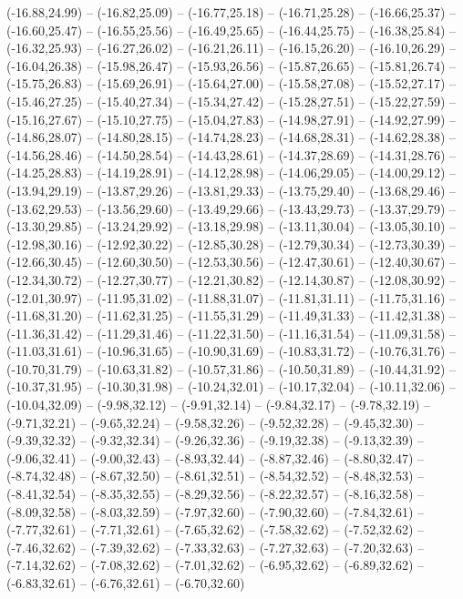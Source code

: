 {  (-16.88,24.99) -- (-16.82,25.09) -- (-16.77,25.18) -- (-16.71,25.28) -- (-16.66,25.37) -- (-16.60,25.47) -- (-16.55,25.56) --
  (-16.49,25.65) -- (-16.44,25.75) -- (-16.38,25.84) -- (-16.32,25.93) -- (-16.27,26.02) -- (-16.21,26.11) -- (-16.15,26.20) --
  (-16.10,26.29) -- (-16.04,26.38) -- (-15.98,26.47) -- (-15.93,26.56) -- (-15.87,26.65) -- (-15.81,26.74) -- (-15.75,26.83) --
  (-15.69,26.91) -- (-15.64,27.00) -- (-15.58,27.08) -- (-15.52,27.17) -- (-15.46,27.25) -- (-15.40,27.34) -- (-15.34,27.42) --
  (-15.28,27.51) -- (-15.22,27.59) -- (-15.16,27.67) -- (-15.10,27.75) -- (-15.04,27.83) -- (-14.98,27.91) -- (-14.92,27.99) --
  (-14.86,28.07) -- (-14.80,28.15) -- (-14.74,28.23) -- (-14.68,28.31) -- (-14.62,28.38) -- (-14.56,28.46) -- (-14.50,28.54) --
  (-14.43,28.61) -- (-14.37,28.69) -- (-14.31,28.76) -- (-14.25,28.83) -- (-14.19,28.91) -- (-14.12,28.98) -- (-14.06,29.05) --
  (-14.00,29.12) -- (-13.94,29.19) -- (-13.87,29.26) -- (-13.81,29.33) -- (-13.75,29.40) -- (-13.68,29.46) -- (-13.62,29.53) --
  (-13.56,29.60) -- (-13.49,29.66) -- (-13.43,29.73) -- (-13.37,29.79) -- (-13.30,29.85) -- (-13.24,29.92) -- (-13.18,29.98) --
  (-13.11,30.04) -- (-13.05,30.10) -- (-12.98,30.16) -- (-12.92,30.22) -- (-12.85,30.28) -- (-12.79,30.34) -- (-12.73,30.39) --
  (-12.66,30.45) -- (-12.60,30.50) -- (-12.53,30.56) -- (-12.47,30.61) -- (-12.40,30.67) -- (-12.34,30.72) -- (-12.27,30.77) --
  (-12.21,30.82) -- (-12.14,30.87) -- (-12.08,30.92) -- (-12.01,30.97) -- (-11.95,31.02) -- (-11.88,31.07) -- (-11.81,31.11) --
  (-11.75,31.16) -- (-11.68,31.20) -- (-11.62,31.25) -- (-11.55,31.29) -- (-11.49,31.33) -- (-11.42,31.38) -- (-11.36,31.42) --
  (-11.29,31.46) -- (-11.22,31.50) -- (-11.16,31.54) -- (-11.09,31.58) -- (-11.03,31.61) -- (-10.96,31.65) -- (-10.90,31.69) --
  (-10.83,31.72) -- (-10.76,31.76) -- (-10.70,31.79) -- (-10.63,31.82) -- (-10.57,31.86) -- (-10.50,31.89) -- (-10.44,31.92) --
  (-10.37,31.95) -- (-10.30,31.98) -- (-10.24,32.01) -- (-10.17,32.04) -- (-10.11,32.06) -- (-10.04,32.09) -- (-9.98,32.12) --
  (-9.91,32.14) -- (-9.84,32.17) -- (-9.78,32.19) -- (-9.71,32.21) -- (-9.65,32.24) -- (-9.58,32.26) -- (-9.52,32.28) --
  (-9.45,32.30) -- (-9.39,32.32) -- (-9.32,32.34) -- (-9.26,32.36) -- (-9.19,32.38) -- (-9.13,32.39) -- (-9.06,32.41) --
  (-9.00,32.43) -- (-8.93,32.44) -- (-8.87,32.46) -- (-8.80,32.47) -- (-8.74,32.48) -- (-8.67,32.50) -- (-8.61,32.51) --
  (-8.54,32.52) -- (-8.48,32.53) -- (-8.41,32.54) -- (-8.35,32.55) -- (-8.29,32.56) -- (-8.22,32.57) -- (-8.16,32.58) --
  (-8.09,32.58) -- (-8.03,32.59) -- (-7.97,32.60) -- (-7.90,32.60) -- (-7.84,32.61) -- (-7.77,32.61) -- (-7.71,32.61) --
  (-7.65,32.62) -- (-7.58,32.62) -- (-7.52,32.62) -- (-7.46,32.62) -- (-7.39,32.62) -- (-7.33,32.63) -- (-7.27,32.63) --
  (-7.20,32.63) -- (-7.14,32.62) -- (-7.08,32.62) -- (-7.01,32.62) -- (-6.95,32.62) -- (-6.89,32.62) -- (-6.83,32.61) --
  (-6.76,32.61) -- (-6.70,32.60)}
